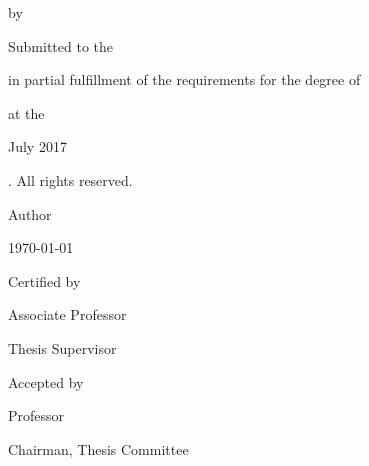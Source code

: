 \documentclass[
  12pt, %
  english, %
  doublespacing, %
]{setting} %
\author{Ching-Wei Chen} %
\newcommand\blankpage{
  \null
  \thispagestyle{empty}
  \addtocounter{page}{-1}
  \newpage
}
\begin{document}
\frontmatter %
\pagestyle{plain} %

\afterpage{\blankpage}

\afterpage{\blankpage} %



\iffalse
\begin{titlepage}
  \begin{center} 
    {\Large \bfseries \ttitle \par}
    \bigskip
    {\normalsize by \par}
    \bigskip
    {\large \authorname \par}
    \bigskip
    {\normalsize Submitted to the \deptname \par in partial fulfillment of the requirements for the degree of \par}
    \bigskip
    {\large \degreename \par}
    \bigskip    
    {at the \par}
    \bigskip
    {\large \MakeUppercase{\univname} \par}
    \bigskip
    {\normalsize July 2017 \par}
    \bigskip
    {\textcopyright \space \univname {}. All rights reserved. \par}
    \bigskip \bigskip \bigskip 
    \begin{flushleft}
      {\large Author \dotfill \par}
    \end{flushleft}
    \begin{flushright} 
      {\deptname \par \today \par}
    \end{flushright}
    \begin{flushleft}
      {\large Certified by \dotfill \par}
    \end{flushleft}
    \begin{flushright} 
      {\supname \par Associate Professor \par Thesis Supervisor \par}
    \end{flushright}
    \begin{flushleft}
      {\large Accepted by \dotfill \par}
    \end{flushleft}
    \begin{flushright} 
      {\examname \par Professor \par Chairman, Thesis Committee \par}
    \end{flushright}
  \end{center}
\end{titlepage}
\end{document}
